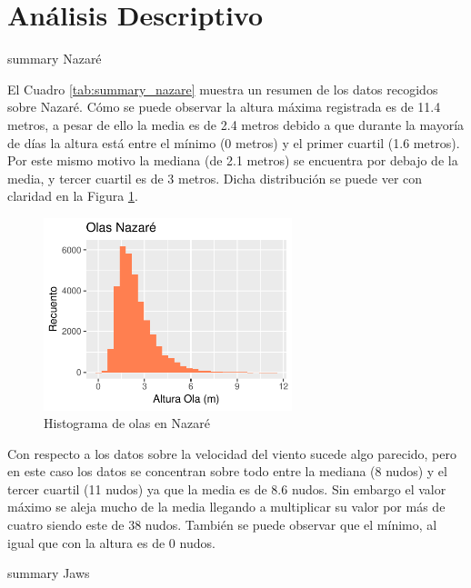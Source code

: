 \section{Análisis Descriptivo}%
\label{sec:metodos}

\begin{table}[htbp]
    \centering
    
    \caption{summary Nazaré}
    \label{tab:summary_nazare}
\end{table}

El Cuadro \ref{tab:summary_nazare} muestra un resumen de los datos recogidos sobre Nazaré. Cómo se puede observar la altura máxima registrada es de 11.4 metros, a pesar de ello la media es de 2.4 metros debido a que durante la mayoría de días la altura está entre el mínimo (0 metros) y el primer cuartil (1.6 metros). Por este mismo motivo la mediana (de 2.1 metros) se encuentra por debajo de la media, y tercer cuartil es de 3 metros. Dicha distribución se puede ver con claridad en la Figura \ref{fig:hist_waves_nazare}.

\begin{figure}[H]
    \centering
    \includegraphics[height=5.6cm]{./figures/nazare_hist_wave.pdf}
    \caption{Histograma de olas en Nazaré}
    \label{fig:hist_waves_nazare}
\end{figure}

Con respecto a los datos sobre la velocidad del viento sucede algo parecido, pero en este caso los datos se concentran sobre todo entre la mediana (8 nudos) y el tercer cuartil (11 nudos) ya que la media es de 8.6 nudos. Sin embargo el valor máximo se aleja mucho de la media llegando a multiplicar su valor por más de cuatro siendo este de 38 nudos. También se puede observar que el mínimo, al igual que con la altura es de 0 nudos.


\begin{table}[htbp]
    \centering
    
    \caption{summary Jaws}
    \label{tab:summary_jaws}
\end{table}


